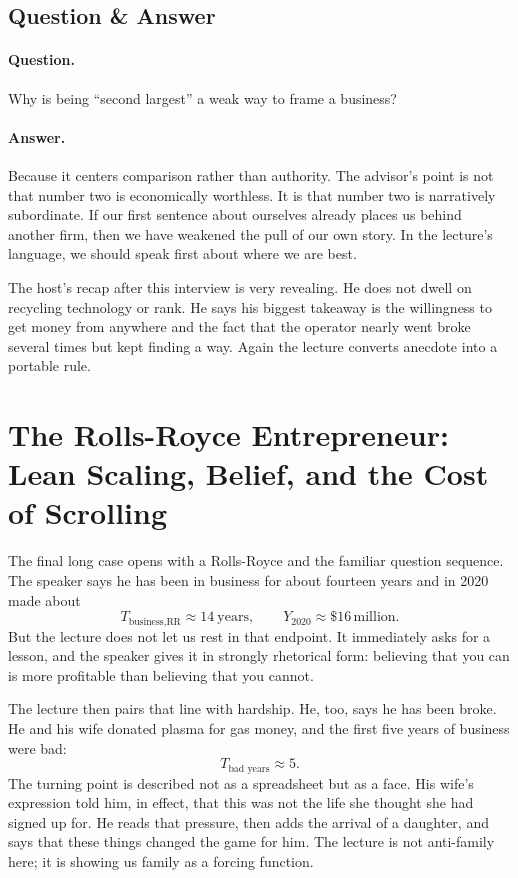 \subsection{Question \& Answer}

\paragraph{Question.} Why is being ``second largest'' a weak way to frame a business?

\paragraph{Answer.} Because it centers comparison rather than authority. The advisor's point is not that number two is economically worthless. It is that number two is narratively subordinate. If our first sentence about ourselves already places us behind another firm, then we have weakened the pull of our own story. In the lecture's language, we should speak first about where we are best.

The host's recap after this interview is very revealing. He does not dwell on recycling technology or rank. He says his biggest takeaway is the willingness to get money from anywhere and the fact that the operator nearly went broke several times but kept finding a way. Again the lecture converts anecdote into a portable rule.

\section{The Rolls-Royce Entrepreneur: Lean Scaling, Belief, and the Cost of Scrolling}

The final long case opens with a Rolls-Royce and the familiar question sequence. The speaker says he has been in business for about fourteen years and in 2020 made about
\begin{equation}
T_{\text{business,RR}} \approx 14\ \text{years},\qquad
Y_{2020} \approx \$16\,\text{million}.
\end{equation}
But the lecture does not let us rest in that endpoint. It immediately asks for a lesson, and the speaker gives it in strongly rhetorical form: believing that you can is more profitable than believing that you cannot.

The lecture then pairs that line with hardship. He, too, says he has been broke. He and his wife donated plasma for gas money, and the first five years of business were bad:
\begin{equation}
T_{\text{bad years}} \approx 5.
\end{equation}
The turning point is described not as a spreadsheet but as a face. His wife's expression told him, in effect, that this was not the life she thought she had signed up for. He reads that pressure, then adds the arrival of a daughter, and says that these things changed the game for him. The lecture is not anti-family here; it is showing us family as a forcing function.

